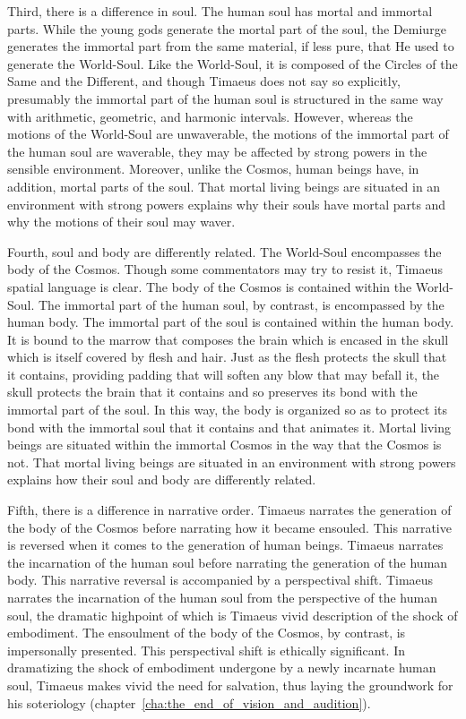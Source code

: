 Third, there is a difference in soul. The human soul has mortal and immortal parts. While the young gods generate the mortal part of the soul, the Demiurge generates the immortal part from the same material, if less pure, that He used to generate the World-Soul. Like the World-Soul, it is composed of the Circles of the Same and the Different, and though Timaeus does not say so explicitly, presumably the immortal part of the human soul is structured in the same way with arithmetic, geometric, and harmonic intervals. However, whereas the motions of the World-Soul are unwaverable, the motions of the immortal part of the human soul are waverable, they may be affected by strong powers in the sensible environment. Moreover, unlike the Cosmos, human beings have, in addition, mortal parts of the soul. That mortal living beings are situated in an environment with strong powers explains why their souls have mortal parts and why the motions of their soul may waver.

Fourth, soul and body are differently related. The World-Soul encompasses the body of the Cosmos. Though some commentators may try to resist it, Timaeus spatial language is clear. The body of the Cosmos is contained within the World-Soul. The immortal part of the human soul, by contrast, is encompassed by the human body. The immortal part of the soul is contained within the human body. It is bound to the marrow that composes the brain which is encased in the skull which is itself covered by flesh and hair. Just as the flesh protects the skull that it contains, providing padding that will soften any blow that may befall it, the skull protects the brain that it contains and so preserves its bond with the immortal part of the soul. In this way, the body is organized so as to protect its bond with the immortal soul that it contains and that animates it. Mortal living beings are situated within the immortal Cosmos in the way that the Cosmos is not. That mortal living beings are situated in an environment with strong powers explains how their soul and body are differently related.

Fifth, there is a difference in narrative order. Timaeus narrates the generation of the body of the Cosmos before narrating how it became ensouled. This narrative is reversed when it comes to the generation of human beings. Timaeus narrates the incarnation of the human soul before narrating the generation of the human body. This narrative reversal is accompanied by a perspectival shift. Timaeus narrates the incarnation of the human soul from the perspective of the human soul, the dramatic highpoint of which is Timaeus vivid description of the shock of embodiment. The ensoulment of the body of the Cosmos, by contrast, is impersonally presented. This perspectival shift is ethically significant. In dramatizing the shock of embodiment undergone by a newly incarnate human soul, Timaeus makes vivid the need for salvation, thus laying the groundwork for his soteriology (chapter~\ref{cha:the_end_of_vision_and_audition}).


